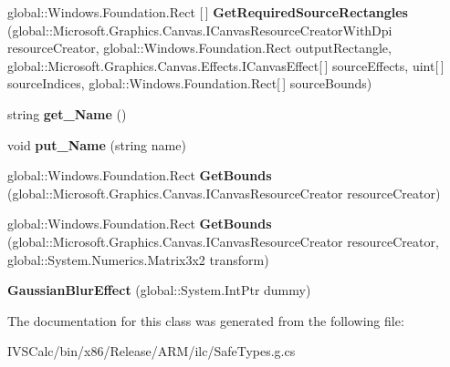 \begin{DoxyCompactItemize}
global\+::\+Windows.\+Foundation.\+Rect \mbox{[}$\,$\mbox{]} {\bfseries Get\+Required\+Source\+Rectangles} (global\+::\+Microsoft.\+Graphics.\+Canvas.\+I\+Canvas\+Resource\+Creator\+With\+Dpi resource\+Creator, global\+::\+Windows.\+Foundation.\+Rect output\+Rectangle, global\+::\+Microsoft.\+Graphics.\+Canvas.\+Effects.\+I\+Canvas\+Effect\mbox{[}$\,$\mbox{]} source\+Effects, uint\mbox{[}$\,$\mbox{]} source\+Indices, global\+::\+Windows.\+Foundation.\+Rect\mbox{[}$\,$\mbox{]} source\+Bounds)
\item 
\mbox{\label{class_microsoft_1_1_graphics_1_1_canvas_1_1_effects_1_1_gaussian_blur_effect_aa4fc095514a67d0f4aa6ef9577e46833}} 
string {\bfseries get\+\_\+\+Name} ()
\item 
\mbox{\label{class_microsoft_1_1_graphics_1_1_canvas_1_1_effects_1_1_gaussian_blur_effect_a98e8bd16e0d6aef72ae476b241eb79da}} 
void {\bfseries put\+\_\+\+Name} (string name)
\item 
\mbox{\label{class_microsoft_1_1_graphics_1_1_canvas_1_1_effects_1_1_gaussian_blur_effect_a67d0aa0daf4bf8acde189a04deefd508}} 
global\+::\+Windows.\+Foundation.\+Rect {\bfseries Get\+Bounds} (global\+::\+Microsoft.\+Graphics.\+Canvas.\+I\+Canvas\+Resource\+Creator resource\+Creator)
\item 
\mbox{\label{class_microsoft_1_1_graphics_1_1_canvas_1_1_effects_1_1_gaussian_blur_effect_a650b47ec2f52a2c56cdc458ed3800b47}} 
global\+::\+Windows.\+Foundation.\+Rect {\bfseries Get\+Bounds} (global\+::\+Microsoft.\+Graphics.\+Canvas.\+I\+Canvas\+Resource\+Creator resource\+Creator, global\+::\+System.\+Numerics.\+Matrix3x2 transform)
\item 
\mbox{\label{class_microsoft_1_1_graphics_1_1_canvas_1_1_effects_1_1_gaussian_blur_effect_a001441f34b40b123ff0a4f6c0fa5adbb}} 
{\bfseries Gaussian\+Blur\+Effect} (global\+::\+System.\+Int\+Ptr dummy)
\end{DoxyCompactItemize}


The documentation for this class was generated from the following file\+:\begin{DoxyCompactItemize}
\item 
I\+V\+S\+Calc/bin/x86/\+Release/\+A\+R\+M/ilc/Safe\+Types.\+g.\+cs\end{DoxyCompactItemize}
